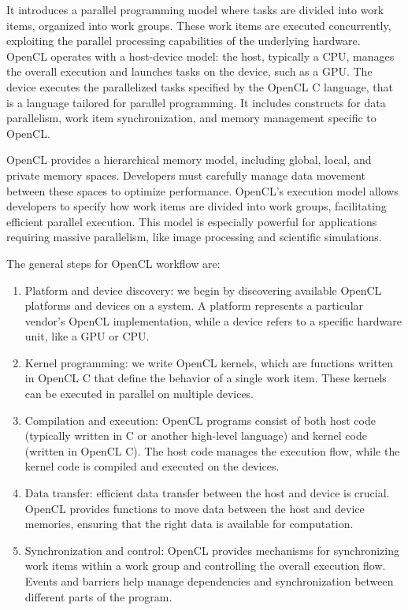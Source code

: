 \documentclass[titlepage]{article}
\begin{document}
It introduces a parallel programming model where tasks are divided into work items, organized into work groups. These work items are executed concurrently, exploiting the parallel processing capabilities of the underlying hardware. OpenCL operates with a host-device model: the host, typically a CPU, manages the overall execution and launches tasks on the device, such as a GPU. The device executes the parallelized tasks specified by the OpenCL C language, that is a language tailored for parallel programming. It includes constructs for data parallelism, work item synchronization, and memory management specific to OpenCL.

OpenCL provides a hierarchical memory model, including global, local, and private memory spaces. Developers must carefully manage data movement between these spaces to optimize performance. OpenCL's execution model allows developers to specify how work items are divided into work groups, facilitating efficient parallel execution. This model is especially powerful for applications requiring massive parallelism, like image processing and scientific simulations.

The general steps for OpenCL workflow are:
\begin{enumerate}
    \item Platform and device discovery: we begin by discovering available OpenCL platforms and devices on a system. A platform represents a particular vendor's OpenCL implementation, while a device refers to a specific hardware unit, like a GPU or CPU.
    \item Kernel programming: we write OpenCL kernels, which are functions written in OpenCL C that define the behavior of a single work item. These kernels can be executed in parallel on multiple devices.
    \item Compilation and execution: OpenCL programs consist of both host code (typically written in C or another high-level language) and kernel code (written in OpenCL C). The host code manages the execution flow, while the kernel code is compiled and executed on the devices.
    \item Data transfer: efficient data transfer between the host and device is crucial. OpenCL provides functions to move data between the host and device memories, ensuring that the right data is available for computation.
    \item Synchronization and control: OpenCL provides mechanisms for synchronizing work items within a work group and controlling the overall execution flow. Events and barriers help manage dependencies and synchronization between different parts of the program.
\end{enumerate}
\end{document}
